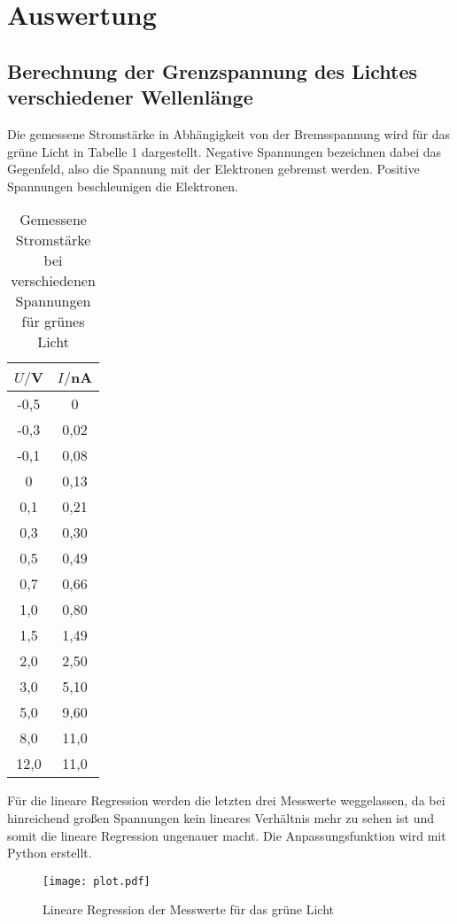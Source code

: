 \section{Auswertung}
\label{sec:Auswertung}

\subsection{Berechnung der Grenzspannung des Lichtes verschiedener Wellenlänge}


Die gemessene Stromstärke in Abhängigkeit von der Bremsspannung wird für das grüne
Licht in Tabelle 1 dargestellt. Negative Spannungen bezeichnen dabei das Gegenfeld, also
die Spannung mit der Elektronen gebremst werden. Positive Spannungen beschleunigen die Elektronen.


\begin{table}[H]
  \centering
  \caption{Gemessene Stromstärke bei verschiedenen Spannungen für grünes Licht}
  \label{tab:Spannungsamplitude}
  \begin{tabular}{c c}
    \toprule
    $U/$V & $I/$nA \\
    \midrule
    -0,5 & 0 \\
    -0,3 & 0,02 \\
    -0,1 & 0,08 \\
     0	 & 0,13 \\
     0,1 & 0,21 \\
     0,3 & 0,30 \\
     0,5 & 0,49 \\
     0,7 & 0,66 \\
     1,0 & 0,80 \\
     1,5 & 1,49 \\
     2,0 & 2,50 \\
     3,0 & 5,10 \\
     5,0 & 9,60 \\
     8,0 & 11,0 \\
    12,0 & 11,0 \\
    \bottomrule
  \end{tabular}
\end{table}

Für die lineare Regression werden die letzten drei Messwerte weggelassen, da bei hinreichend
großen Spannungen kein lineares Verhältnis mehr zu sehen ist und somit die lineare Regression
ungenauer macht. Die Anpassungsfunktion wird mit Python erstellt.

\begin{figure}[H]
  \centering
  \texttt{[image: plot.pdf]}
  \caption{Lineare Regression der Messwerte für das grüne Licht}
  \label{fig:plot}
\end{figure}

